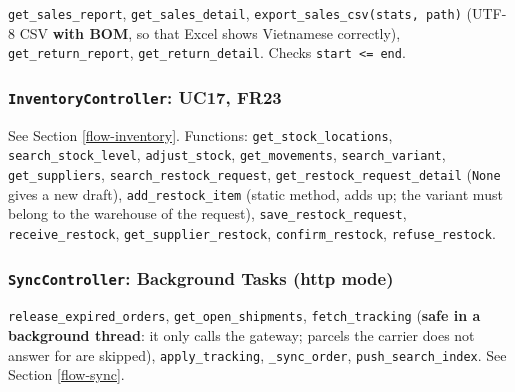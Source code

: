 \texttt{get\_\allowbreak{}sales\_\allowbreak{}report}, \texttt{get\_\allowbreak{}sales\_\allowbreak{}detail},
\texttt{export\_\allowbreak{}sales\_\allowbreak{}csv(\allowbreak{}stats,\allowbreak{} path)} (UTF-8 CSV \textbf{with BOM},
so that Excel shows Vietnamese correctly), \texttt{get\_\allowbreak{}return\_\allowbreak{}report},
\texttt{get\_\allowbreak{}return\_\allowbreak{}detail}. Checks \texttt{start \textless{}=\allowbreak{} end}.

\hypertarget{inventorycontroller-uc17-fr23}{%
\subsubsection{\texorpdfstring{\texttt{InventoryController}: UC17,
FR23}{InventoryController: UC17, FR23}}\label{inventorycontroller-uc17-fr23}}

See Section \ref{flow-inventory}. Functions:
\texttt{get\_\allowbreak{}stock\_\allowbreak{}locations}, \texttt{search\_\allowbreak{}stock\_\allowbreak{}level},
\texttt{adjust\_\allowbreak{}stock}, \texttt{get\_\allowbreak{}movements},
\texttt{search\_\allowbreak{}variant}, \texttt{get\_\allowbreak{}suppliers},
\texttt{search\_\allowbreak{}restock\_\allowbreak{}request},
\texttt{get\_\allowbreak{}restock\_\allowbreak{}request\_\allowbreak{}detail} (\texttt{None} gives a new
draft), \texttt{add\_\allowbreak{}restock\_\allowbreak{}item} (static method, adds up; the variant
must belong to the warehouse of the request),
\texttt{save\_\allowbreak{}restock\_\allowbreak{}request}, \texttt{receive\_\allowbreak{}restock},
\texttt{get\_\allowbreak{}supplier\_\allowbreak{}restock}, \texttt{confirm\_\allowbreak{}restock},
\texttt{refuse\_\allowbreak{}restock}.

\hypertarget{synccontroller-background-tasks-http-mode}{%
\subsubsection{\texorpdfstring{\texttt{SyncController}: Background Tasks
(http
mode)}{SyncController: Background Tasks (http mode)}}\label{synccontroller-background-tasks-http-mode}}

\texttt{release\_\allowbreak{}expired\_\allowbreak{}orders}, \texttt{get\_\allowbreak{}open\_\allowbreak{}shipments},
\texttt{fetch\_\allowbreak{}tracking} (\textbf{safe in a background thread}: it only
calls the gateway; parcels the carrier does not answer for are skipped),
\texttt{apply\_\allowbreak{}tracking}, \texttt{\_\allowbreak{}sync\_\allowbreak{}order},
\texttt{push\_\allowbreak{}search\_\allowbreak{}index}. See Section \ref{flow-sync}.

